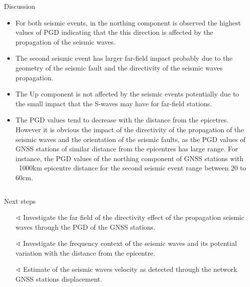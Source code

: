 \documentclass[final,a0,portrait]{beamer}
\newlength{\onecolwid}
\newlength{\twocolwid}
\begin{document}
\begin{frame}[t]
\begin{columns}[t]
\begin{column}{\twocolwid}
\begin{columns}[t]
\begin{column}{\onecolwid}
\begin{block}{Discussion}
{\begin{itemize}\setlength\itemsep{.6em} \justifying
  \item For both seismic events, in the northing component is observed the highest values of PGD indicating that the this direction is affected by the propagation of the seismic waves.
  \item The second seismic event has larger far-field impact probably due to the geometry of the seismic fault and the directivity of the seismic waves propagation.
  \item The Up component is not affected by the seismic events potentially due to the small impact that the S-waves may have for far-field stations.
  \item The PGD values tend to decrease with the distance from the epicetres. However it is obvious the impact of the directivity of the propagation of the seismic waves and the orientation of the seismic faults, as the PGD values of GNSS stations of similar distance from the epicentres has large range. For instance, the PGD values of the northing component of GNSS stations with ~1000km epicentre distance for the second seismic event range between 20 to 60cm.
\end{itemize}
}



\end{block}
\end{column}
\end{columns}

\vspace*{-2.6cm}
\begin{block}{Next steps}
{\small
\begin{itemize}\setlength\itemsep{.5em}
  \item[$\sphericalangle$] Investigate the far field of the directivity effect of the propagation seismic waves through the PGD of the GNSS stations.
  \item[$\sphericalangle$] Investigate the frequency context of the seismic waves and its potential variation with the distance from the epicentre.
  \item[$\sphericalangle$] Estimate of the seismic waves velocity as detected through the network GNSS stations displacement.
\end{itemize}
}

\end{block}


\end{column}
\end{columns}
\end{frame}
\end{document}
